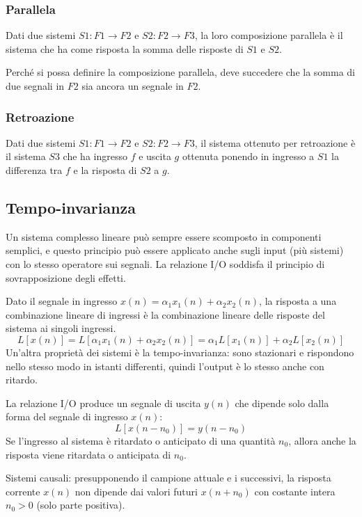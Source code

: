\subsubsection{Parallela}
Dati due sistemi $S1 : F1 \rightarrow F2$ e $S2 : F2 \rightarrow F3$, la loro composizione parallela è il sistema che ha come risposta la somma delle risposte di $S1$ e $S2$.

Perché si possa definire la composizione parallela, deve succedere che la somma di due segnali in $F2$ sia ancora un segnale in $F2$.

\subsubsection{Retroazione}
Dati due sistemi $S1 : F1 \rightarrow F2$ e $S2 : F2 \rightarrow F3$, il sistema ottenuto per retroazione è il sistema $S3$ che ha ingresso $f$ e uscita $g$ ottenuta ponendo in ingresso a $S1$ la differenza tra $f$ e la risposta di $S2$ a $g$.

\subsection{Tempo-invarianza}
Un sistema complesso lineare può sempre essere scomposto in componenti semplici, e questo principio può essere applicato anche sugli input (più sistemi) con lo stesso operatore sui segnali. La relazione I/O soddisfa il principio di sovrapposizione degli effetti. 

Dato il segnale in ingresso $x(n) = \alpha_1x_1(n) + \alpha_2x_2(n)$, la risposta a una combinazione lineare di ingressi è la combinazione lineare delle risposte del sistema ai singoli ingressi.
$$L[x(n)] = L[\alpha_1x_1(n) + \alpha_2x_2(n)] = \alpha_1L[x_1(n)] + \alpha_2L[x_2(n)]$$
Un'altra proprietà dei sistemi è la tempo-invarianza: sono stazionari e rispondono nello stesso modo in istanti differenti, quindi l'output è lo stesso anche con ritardo. 

La relazione I/O produce un segnale di uscita $y(n)$ che dipende solo dalla forma del segnale di ingresso $x(n)$:
$$L[x(n - n_0)] = y(n - n_0)$$
Se l'ingresso al sistema è ritardato o anticipato di una quantità $n_0$, allora anche la risposta viene ritardata o anticipata di $n_0$.

Sistemi causali: presupponendo il campione attuale e i successivi, la risposta corrente $x(n)$ non dipende dai valori futuri $x(n + n_0)$ con costante intera $n_0 > 0$ (solo parte positiva).

